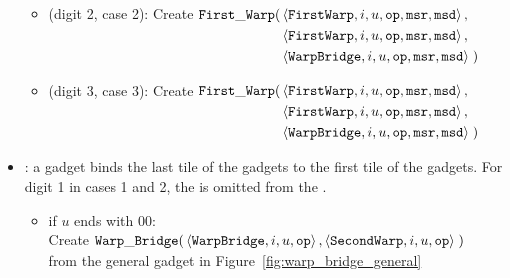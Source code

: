 \begin{itemize}
\begin{itemize}
                \item (digit 2, case 2): Create
                $\begin{aligned}[t]
                    {\tt First\_Warp}(& \left\langle {\tt FirstWarp},  i, u, {\tt op}, {\tt msr}, {\tt msd} \right\rangle, \\
                               & \left\langle {\tt FirstWarp},  i, u, {\tt op}, {\tt msr}, {\tt msd} \right\rangle, \\
                               & \left\langle {\tt WarpBridge}, i, u, {\tt op}, {\tt msr}, {\tt msd} \right\rangle \;)
                \end{aligned}$
                \vspace{.5cm}

                \item (digit 3, case 3): Create
                $\begin{aligned}[t]
                    {\tt First\_Warp}(& \left\langle {\tt FirstWarp},  i, u, {\tt op}, {\tt msr}, {\tt msd} \right\rangle, \\
                               & \left\langle {\tt FirstWarp},  i, u, {\tt op}, {\tt msr}, {\tt msd} \right\rangle, \\
                               & \left\langle {\tt WarpBridge}, i, u, {\tt op}, {\tt msr}, {\tt msd} \right\rangle \;)
                \end{aligned}$
                \vspace{.5cm}

            \end{itemize}
        \vspace{.5cm}

        \item {\warpbridge}: a {\warpbridge} gadget binds the last tile of the {\firstwarp} gadgets to the
             first tile of the {\secondwarp} gadgets. For digit 1 in cases 1 and 2, the
             {\warpbridge} is omitted from the {\warpunit}.

        \begin{itemize}

            \item if $u$ ends with 00:\\
            Create
            $\begin{aligned}[t]
                {\tt Warp\_Bridge}(& \left\langle {\tt WarpBridge}, i, u, {\tt op} \right\rangle,
                              \left\langle {\tt SecondWarp}, i, u, {\tt op} \right\rangle \;)
            \end{aligned}$ \\ from the general gadget in Figure~\ref{fig:warp_bridge_general}
            \vspace{.5cm}


\end{itemize}
\end{itemize}
